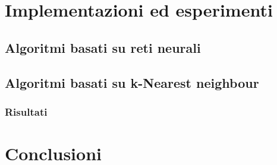 \documentclass[11pt,  oneside, openany]{book}
\begin{document}
\clearpage


	\chapter{Implementazioni ed esperimenti}
	\section{Algoritmi basati su reti neurali}
	\section{Algoritmi basati su k-Nearest neighbour}



% 

	\subsection{Risultati}
	\chapter{Conclusioni}




\end{document}
